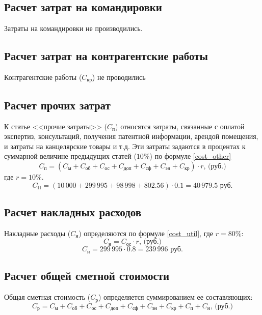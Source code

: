 \subsection{Расчет затрат на командировки}
Затраты на командировки не производились.

\subsection{Расчет затрат на контрагентские работы}
Контрагентские работы ($C_\textit{кр}$) не проводились

\subsection{Расчет прочих затрат}
К статье <<прочие затраты>> ($C_\textit{п}$) относятся затраты, связанные с оплатой экспертиз, консультаций, получения патентной информации, арендой помещения, и затраты на канцелярские товары и т.д. Эти затраты задаются в процентах к суммарной величине предыдущих статей ($10\%$) по формуле \ref{cost_other}
\begin{equation}
	C_\textit{п} = (C_\textit{м}+C_\textit{об}+C_\textit{ос}+C_\textit{доп}+C_\textit{сф}+ C_\textit{эн}+C_\textit{кр})\cdot r \mbox{, (руб.)}
	\label{cost_other}
\end{equation}
где $r=10\%$.
$$
	C_\textit{П} = (10\,000 + 299\,995 + 98\,998 + 802.56)\cdot 0.1 = 40\,979.5 \mbox{ руб.}
$$

\subsection{Расчет накладных расходов}
Накладные расходы ($C_\textit{н}$) определяются по формуле \ref{cost_util}, где $r = 80\%$:
\begin{equation}
	C_\textit{н} = C_\textit{ос} \cdot r \mbox{, (руб.)}
	\label{cost_util}
\end{equation}
$$
	C_\textit{н} = 299\,995 \cdot 0.8 = 239\,996 \mbox{ руб.}
$$

\subsection{Расчет общей сметной стоимости}
Общая сметная стоимость ($C_\textit{р}$) определяется суммированием ее составляющих:
\begin{equation}
	C_\textit{р} = C_\textit{м}+C_\textit{об}+C_\textit{ос}+C_\textit{доп}+C_\textit{сф}+ C_\textit{эн}+C_\textit{кр}+C_\textit{п}+C_\textit{н} \mbox{, (руб.)}
\end{equation}

